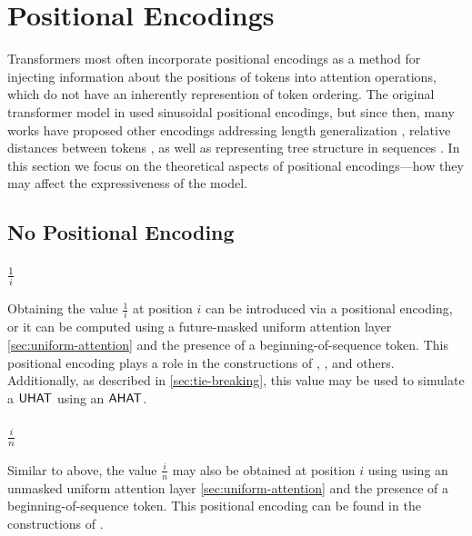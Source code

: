 %
\chapter{Positional Encodings}
%

Transformers most often incorporate positional encodings as a method for injecting information about the positions of tokens into attention operations, which do not have an inherently represention of token ordering. The original transformer model in \citet{vaswani-etal-2017-attention} used sinusoidal positional encodings, but since then, many works have proposed other encodings addressing length generalization \citep{kazemnejad2024impact}, relative distances between tokens \citep{shaw2018self}, as well as representing tree structure in sequences \citep{shiv2019}. In this section we focus on the theoretical aspects of positional encodings---how they may affect the expressiveness of the model.


\section{No Positional Encoding}

\subsection{$\frac{1}{i}$}

Obtaining the value $\frac{1}{i}$ at position $i$ can be introduced via a positional encoding, or it can be computed using a future-masked uniform attention layer \cref{sec:uniform-attention} and the presence of a beginning-of-sequence token. This positional encoding plays a role in the constructions of \citet{barcelo-etal-2024-logical}, \citet{merrill-sabharwal-2024-cot}, and others. Additionally, as described in \cref{sec:tie-breaking}, this value may be used to simulate a $\textsf{UHAT}$ using an $\textsf{AHAT}$.



\subsection{$\frac{i}{n}$}
Similar to above, the value $\frac{i}{n}$ may also be obtained at position $i$ using using an unmasked uniform attention layer \cref{sec:uniform-attention} and the presence of a beginning-of-sequence token. This positional encoding can be found in the constructions of \cite{merrill2023parallelism,chiang-cholak-2022-parity,strobl2024transformers}.

